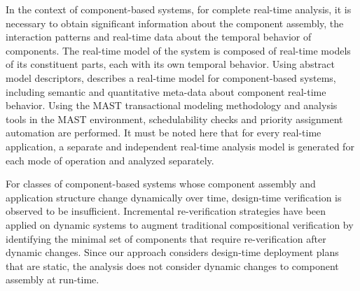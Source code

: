 In the context of component-based systems, for complete real-time analysis, it is necessary to obtain significant information about the component assembly, the interaction patterns and real-time data about the temporal behavior of components. The real-time model of the system is composed of real-time models of its constituent parts, each with its own temporal behavior. Using abstract model descriptors, \cite{Lopez2006} describes a real-time model for component-based systems, including semantic and quantitative meta-data about component real-time behavior. Using the MAST transactional modeling methodology \cite{MAST1, MAST2} and analysis tools in the MAST environment, schedulability checks and priority assignment automation are performed. It must be noted here that for every real-time application, a separate and independent real-time analysis model is generated for each mode of operation and analyzed separately.



For classes of component-based systems whose component assembly and application structure change dynamically over time, design-time verification is observed to be insufficient. Incremental re-verification strategies \cite{johnson2013} have been applied on dynamic systems to augment traditional compositional verification by identifying the minimal set of components that require re-verification after dynamic changes. Since our approach considers design-time deployment plans that are static, the analysis does not consider dynamic changes to component assembly at run-time. 

\vspace{-0.1in}